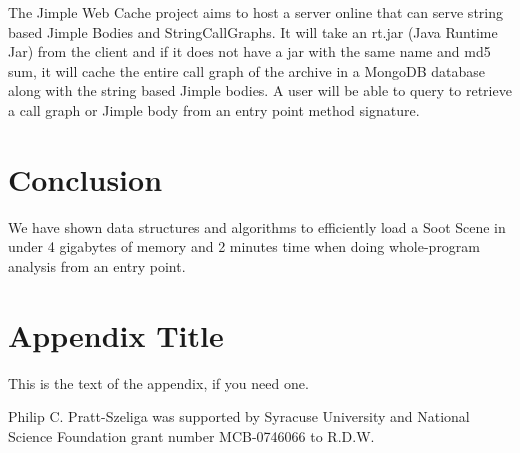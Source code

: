 \documentclass[preprint]{sigplanconf}
\begin{document}
The Jimple Web Cache project aims to host a server online that can serve string based Jimple Bodies and StringCallGraphs. It will take an rt.jar (Java Runtime Jar) from the client and if it does not have a jar with the same name and md5 sum, it will cache the entire call graph of the archive in a MongoDB database along with the string based Jimple bodies. A user will be able to query to retrieve a call graph or Jimple body from an entry point method signature.

\section{Conclusion}
\label{sec:conclusion}
We have shown data structures and algorithms to efficiently load a Soot Scene in under 4 gigabytes of memory and 2 minutes time when doing whole-program analysis from an entry point.

\appendix
\section{Appendix Title}

This is the text of the appendix, if you need one.

\acks
Philip C. Pratt-Szeliga was supported by Syracuse University and National Science Foundation grant number MCB-0746066 to R.D.W.









\end{document}
